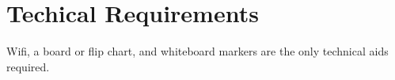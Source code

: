 \section{Techical Requirements}

Wifi, a board or flip chart, and whiteboard markers are the only technical aids required.
